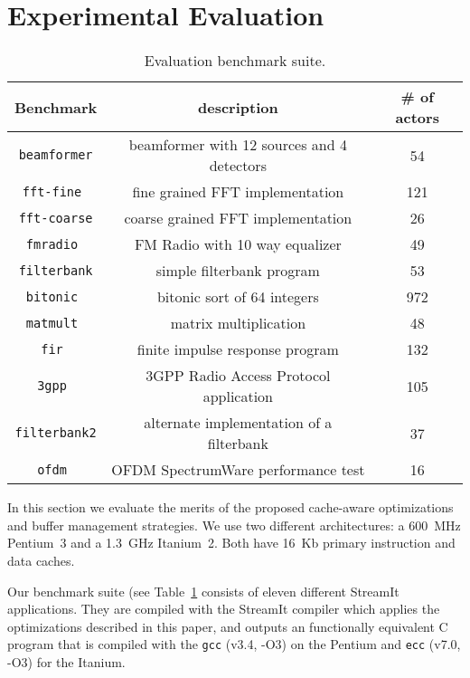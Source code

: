 \section{Experimental Evaluation}
\label{sec:evaluation}

\begin{table}[t]
\center
\label{tab:benchmarks}
{\tiny
\begin{tabular}{|c|c|c|} \hline
{\bf Benchmark}&{\bf description}&{\bf \# of actors}\\ \hline \hline
\texttt{beamformer} &beamformer with 12 sources and 4 detectors& 54 \\ \hline
\texttt{fft-fine	} &fine grained FFT implementation	&	121 \\ \hline
\texttt{fft-coarse} &coarse grained FFT implementation	&	26 \\ \hline
\texttt{fmradio	} &FM Radio with 10 way equalizer	&	49 \\ \hline
\texttt{filterbank} &simple filterbank program	&	53 \\ \hline
\texttt{bitonic	} &bitonic sort of 64 integers	&	972 \\ \hline
\texttt{matmult	} &matrix multiplication	&	48 \\ \hline
\texttt{fir	      } &finite impulse response program	&	132 \\ \hline
\texttt{3gpp	} &3GPP Radio Access Protocol application	&	105 \\ \hline
\texttt{filterbank2}&alternate implementation of a filterbank &	37 \\ \hline
\texttt{ofdm	 }&OFDM SpectrumWare performance test	&	16 \\ \hline
\end{tabular}
}
\vspace{-12pt}
\caption{Evaluation benchmark suite.}
\end{table}


In this section we evaluate the merits of the proposed cache-aware
optimizations and buffer management strategies. We use two
different architectures: a 600~MHz Pentium~3 and a 1.3~GHz
Itanium~2. Both have 16~Kb primary instruction and data caches.

Our benchmark suite (see Table~\ref{tab:benchmarks} consists of eleven
different StreamIt applications. They are compiled with the StreamIt
compiler which applies the optimizations described in this paper, and
outputs an functionally equivalent C program that is compiled with the
\texttt{gcc} (v3.4, -O3) on the Pentium and \texttt{ecc} 
(v7.0, -O3) for the Itanium.

